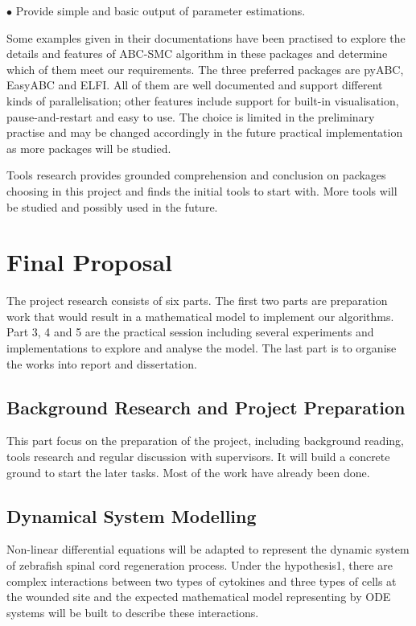 \documentclass{article}
\begin{document}
\quad $\bullet$ Provide simple and basic output of parameter estimations.

Some examples given in their documentations have been practised to explore the details and features of ABC-SMC algorithm in these packages and determine which of them meet our requirements. The three preferred packages are pyABC, EasyABC and ELFI. All of them are well documented and support different kinds of parallelisation; other features include support for built-in visualisation, pause-and-restart and easy to use. The choice is limited in the preliminary practise and may be changed accordingly in the future practical implementation as more packages will be studied.

Tools research provides grounded comprehension and conclusion on packages 
choosing in this project and finds the initial tools to start with. More 
tools will be studied and possibly used in the future.

\section{Final Proposal}

The project research consists of six parts. The first two parts are preparation work that would result in a mathematical model to implement our algorithms. Part 3, 4 and 5 are the practical session including several experiments and implementations to explore and analyse the model. The last part is to organise the works into report and dissertation.

\subsection{Background Research and Project Preparation}

This part focus on the preparation of the project, including background reading, tools research and regular discussion with supervisors. It will build a concrete ground to start the later tasks. Most of the work have already been done.

\subsection{Dynamical System Modelling}

Non-linear differential equations will be adapted to represent the dynamic system of zebrafish spinal cord regeneration process. Under the hypothesis1, there are complex interactions between two types of cytokines and three types of cells at the wounded site and the expected mathematical model representing by ODE systems will be built to describe these interactions.
\end{document}
